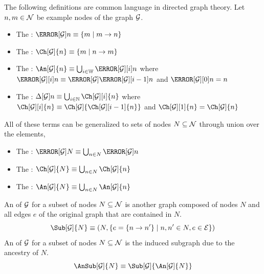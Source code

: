 \documentclass[aps, 10pt, english, twoside, pra, nofootinbib, tightenlines, longbibliography]{revtex4-1}
\begin{document}
    \begin{definition}
        \label{def:graph_terms}
        The following definitions are common language in directed graph theory. Let $n, m \in \mathcal{N}$ be example nodes of the graph $\mathcal{G}$.
        \begin{itemize}
            \item The : $\Pa[\graph]{n} \defined \bc{m \mid m \to n}$
            \item The : $\Ch[\graph]{n} \defined \bc{m \mid n \to m}$
            \item The : $\An[\graph]{n} \defined \bigcup_{i\in\mathbb{W}} \Pa[\graph][i]{n}$ where $\Pa[\graph][i]{n} \defined \Pa[\graph]{\Pa[\graph][i-1]{n}}$ and $\Pa[\graph][0]{n} = n$
            \item The :  $\De[\graph]{n} \defined \bigcup_{i\in\mathbb{N}} \Ch[\graph][i]{n}$ where $\Ch[\graph][i]{n} \defined \Ch[\graph]{\Ch[\graph][i-1]{n}}$ and $\Ch[\graph][1]{n} = \Ch[\graph]{n}$
        \end{itemize}
        All of these terms can be generalized to sets of nodes $N \subseteq \mathcal{N}$ through union over the elements,
        \begin{itemize}
            \item The : $\Pa[\graph]{N} \defined \bigcup_{n\in N}\Pa[\graph]{n}$
            \item The : $\Ch[\graph]{N} \defined \bigcup_{n\in N}\Ch[\graph]{n}$
            \item The : $\An[\graph]{N} \defined \bigcup_{n\in N}\An[\graph]{n}$
        \end{itemize}
    \end{definition}

    \begin{definition}
        An  of $\mathcal{G}$ for a subset of nodes $N \subseteq \mathcal{N}$ is another graph composed of nodes $N$ and all edges $e$ of the original graph that are contained in $N$.
        \[ \Sub[\graph]{N} \defined \br{N, \bc{e = \bc{n \to n'} \mid n, n' \in N, e \in \edges}} \]
        An  of $\mathcal{G}$ for a subset of nodes $N \subseteq \mathcal{N}$ is the induced subgraph due to the ancestry of $N$.
        \[ \AnSub[\graph]{N} \defined \Sub[\graph]{\An[\graph]{N}} \]
    \end{definition}
\end{document}
